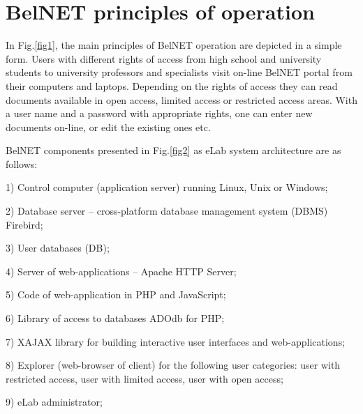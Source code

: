 \documentclass[12pt]{article}
\begin{document}
\section {BelNET principles of operation}
In Fig.\ref{fig1}, the main principles of BelNET operation are
depicted in a simple form. Users with different rights of access
from high school and university students to university professors
and specialists visit on-line BelNET portal from their computers
and laptops. Depending on the rights of access they can read
documents available in open access, limited access or restricted
access areas. With a user name and a password with appropriate
rights, one can enter new documents on-line, or edit the existing
ones etc.

\begin{figure}[htb]
\end{figure}

\begin{figure}[htb]
\end{figure}

\begin{figure}[htb]
\end{figure}

BelNET components presented in Fig.\ref{fig2} as eLab system
architecture are as follows:

1) Control computer (application server) running Linux, Unix or Windows;

2) Database server -- cross-platform database management system (DBMS) Firebird;

3) User databases (DB);

4) Server of web-applications -- Apache HTTP Server;

5) Code of web-application in PHP and JavaScript;

6) Library of access to databases ADOdb for PHP;

7) XAJAX library for building interactive user interfaces and web-applications;

8) Explorer (web-browser of client) for the following user categories: user with restricted
access, user with limited access, user with open access;

9) eLab administrator;
\end{document}
